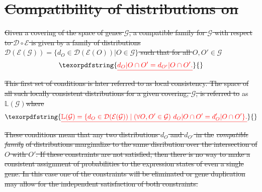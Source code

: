 \documentclass[10pt]{article}
\def\expr{\mathcal{E}}
\def\dist{\mathcal{D}}
\def\gnpm{network-network state maps} %
\providecommand{\DIFaddtex}[1]{{\protect\color{blue}\uwave{#1}}} %
\providecommand{\DIFdeltex}[1]{{\protect\color{red}\sout{#1}}}                      %
\providecommand{\DIFaddbegin}{} %
\providecommand{\DIFaddend}{} %
\providecommand{\DIFdelbegin}{} %
\providecommand{\DIFdelend}{} %
\providecommand{\DIFadd}[1]{\texorpdfstring{\DIFaddtex{#1}}{#1}} %
\providecommand{\DIFdel}[1]{\texorpdfstring{\DIFdeltex{#1}}{}} %
\begin{document}
\section{\DIFdel{Compatibility of distributions on }%
}%
\addtocounter{section}{-1}%
\DIFdel{Given a covering of the
space of genes $\mathcal{G}$, a compatible family for $\mathcal{G}$ with respect to $\mathcal{D} \circ \mathcal{E}$ is given by a family of distributions $\dist{}(\expr{}(\mathcal{G})) = \{d_O \in \dist (\mathcal{E}(O)) | O \in \mathcal{G}\}$ such that for all $O, O' \in \mathcal{G}$
}\begin{align*}\DIFdel{\label{eq:sheafcond}
d_O|O \cap O' = d_{O'}|O \cap O'.
}\end{align*}
\DIFdel{This first set of conditions is later referred to as local consistency. The space of all such locally consistent distributions for a
given covering, $\mathcal{G}$, is referred to }\DIFdelend as $\mathbb{L}(\mathcal{G})$\DIFdelbegin \DIFdel{where
}\begin{displaymath}\DIFdel{
\mathbb{L}(\mathcal{G}) = \{ d_O  \in \dist{}(\expr{}(\mathcal{G})) \mid (\forall O,O' \in \mathcal{G})\,\, d_O|O \cap O' = d_O'|O \cap O' \}.
}\end{displaymath}
\DIFdel{These conditions mean that any two distributions $d_O$ and $d_{O'}$ in the }\emph{\DIFdel{compatible family}} %
\DIFdel{of distributions marginalize to the same disribution over the intersection of $O$ with $O'$. If these constraints are not satisfied, then there is no way to make a consistent assignment of probabilities to
the expression states of even a single gene.  In this case one of the constraints will be eliminated or gene duplication may allow for the independent satisfaction of both constraints.
}\DIFdelend \DIFaddbegin \DIFadd{.
}\DIFaddend
\end{document}
